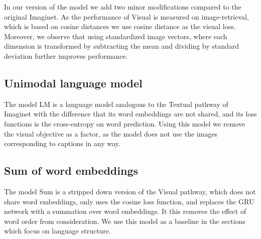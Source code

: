 In our version of the model we add two minor modifications 
compared to the original {\sc Imaginet}. As the performance of
{\sc Visual} is measured on image-retrieval, which is based on cosine 
distances we use cosine distance as the visual loss.
Moreover, we observe that using standardized image vectors, where each dimension 
is transformed by subtracting the mean and dividing by standard deviation further
improves performance.






\subsection{Unimodal language model}
The model {\sc LM} is a language model analogous to the {\sc Textual}
pathway of {\sc Imaginet} with the difference that its word embeddings
are not shared, and its loss functions is the cross-entropy on word
prediction. Using this model we remove the visual objective as a
factor, as the model does not use the images corresponding to captions
in any way.

\subsection{Sum of word embeddings}
The model {\sc Sum} is a stripped down version of the {\sc Visual}
pathway, which does not share word embeddings, only uses the cosine
loss function, and replaces the GRU network with a summation over word
embeddings. It this removes the effect of word order from
consideration. We use this model as a baseline in the sections which
focus on language structure. 
